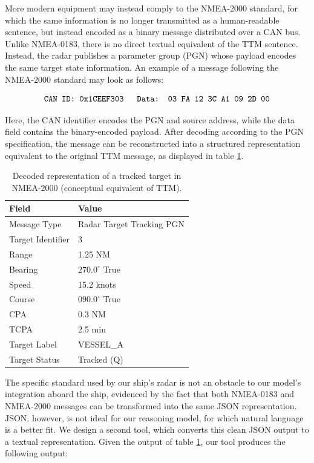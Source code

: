 \documentclass[10pt]{reportMaster}
\begin{document}
More modern equipment may instead comply to the NMEA-2000 standard, for which the same information is no longer transmitted as a human-readable sentence, but instead encoded as a binary message distributed over a CAN bus. Unlike NMEA-0183, there is no direct textual equivalent of the TTM sentence. Instead, the radar publishes a parameter group (PGN) whose payload encodes the same target state information. An example of a message following the NMEA-2000 standard may look as follows:

\begin{equation}
\texttt{CAN ID: 0x1CEEF303 \quad Data: 03 FA 12 3C A1 09 2D 00}
\end{equation}

Here, the CAN identifier encodes the PGN and source address, while the data field contains the binary-encoded payload. After decoding according to the PGN specification, the message can be reconstructed into a structured representation equivalent to the original TTM message, as displayed in table \ref{tab:nmea2000-radar-example}.

\begin{table}[htbp]
\centering
\label{tab:nmea2000-radar-example}
\begin{tabular}{ll}
\hline
\textbf{Field} & \textbf{Value} \\
\hline
Message Type & Radar Target Tracking PGN \\
Target Identifier & 3 \\
Range & 1.25 NM \\
Bearing & $270.0^\circ$ True \\
Speed & 15.2 knots \\
Course & $090.0^\circ$ True \\
CPA & 0.3 NM \\
TCPA & 2.5 min \\
Target Label & VESSEL\_A \\
Target Status & Tracked (Q) \\
\hline
\end{tabular}
\caption{Decoded representation of a tracked target in NMEA-2000 (conceptual equivalent of TTM).}
\end{table}

The specific standard used by our ship's radar is not an obstacle to our model's integration aboard the ship, evidenced by the fact that both NMEA-0183 and NMEA-2000 messages can be transformed into the same JSON representation. JSON, however, is not ideal for our reasoning model, for which natural language is a better fit. We design a second tool, which converts this clean JSON output to a textual representation. Given the output of table \ref{tab:nmea2000-radar-example}, our tool produces the following output: 
\end{document}
